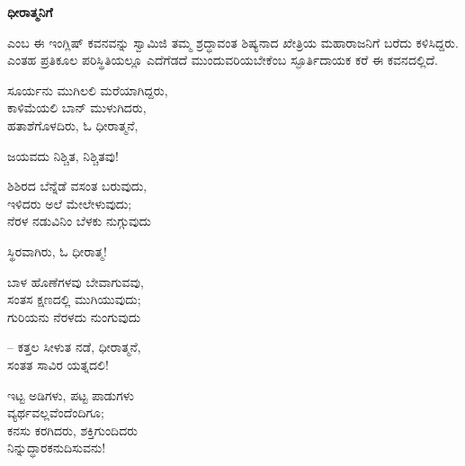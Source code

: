 \begin{myquote}
\end{myquote}

\selectkan

\begin{center}
\textbf{ಧೀರಾತ್ಮನಿಗೆ}
\end{center}

 ಎಂಬ ಈ ಇಂಗ್ಲಿಷ್ ಕವನವನ್ನು ಸ್ವಾಮಿಜಿ ತಮ್ಮ ಶ್ರದ್ಧಾವಂತ ಶಿಷ್ಯನಾದ ಖೇತ್ರಿಯ ಮಹಾರಾಜನಿಗೆ ಬರೆದು ಕಳಿಸಿದ್ದರು. ಎಂತಹ ಪ್ರತಿಕೂಲ ಪರಿಸ್ಥಿತಿಯಲ್ಲೂ ಎದೆಗೆಡದೆ ಮುಂದುವರಿಯಬೇಕೆಂಬ ಸ್ಫೂರ್ತಿದಾಯಕ ಕರೆ ಈ ಕವನದಲ್ಲಿದೆ.

\begin{myquote}
ಸೂರ್ಯನು ಮುಗಿಲಲಿ ಮರೆಯಾಗಿದ್ದರು,\\ಕಾಳಿಮೆಯಲಿ ಬಾನ್ ಮುಳುಗಿದರು,\\ಹತಾಶೆಗೊಳದಿರು, ಓ ಧೀರಾತ್ಮನೆ,
\end{myquote}

\begin{flushright}
ಜಯವದು ನಿಶ್ಚಿತ, ನಿಶ್ಚಿತವು!
\end{flushright}

\begin{myquote}
ಶಿಶಿರದ ಬೆನ್ನೆಡೆ ವಸಂತ ಬರುವುದು,\\ಇಳಿದರು ಅಲೆ ಮೇಲೇಳುವುದು;\\ನೆರಳ ನಡುವಿನಿಂ ಬೆಳಕು ನುಗ್ಗುವುದು
\end{myquote}

\begin{flushright}
ಸ್ಥಿರವಾಗಿರು, ಓ ಧೀರಾತ್ಮ!
\end{flushright}

\begin{myquote}
ಬಾಳ ಹೊಣೆಗಳವು ಬೇವಾಗುವವು,\\ಸಂತಸ ಕ್ಷಣದಲ್ಲಿ ಮುಗಿಯುವುದು;\\ಗುರಿಯನು ನೆರಳದು ನುಂಗುವುದು
\end{myquote}

\begin{flushright}
– ಕತ್ತಲ ಸೀಳುತ ನಡೆ, ಧೀರಾತ್ಮನೆ,\\ಸಂತತ ಸಾವಿರ ಯತ್ನದಲಿ!
\end{flushright}

\begin{myquote}
ಇಟ್ಟ ಅಡಿಗಳು, ಪಟ್ಟ ಪಾಡುಗಳು\\ವ್ಯರ್ಥವಲ್ಲವೆಂದೆಂದಿಗೂ;\\ಕನಸು ಕರಗಿದರು, ಶಕ್ತಿಗುಂದಿದರು\\ನಿನ್ನುದ್ಧಾರಕನುದಿಸುವನು!
\end{myquote}

